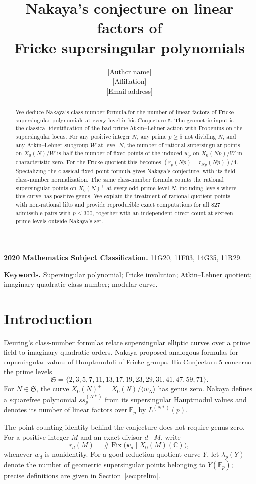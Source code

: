 \documentclass[11pt,a4paper]{article}
\title{Nakaya's conjecture on linear factors of\\Fricke supersingular polynomials}
\author{[Author name]\\\small [Affiliation]\\\small [Email address]}
\date{}
\theoremstyle{remark}\newtheorem{remark}[theorem]{Remark}
\numberwithin{equation}{section}
\newcommand{\C}{\mathbb C}\newcommand{\Fp}{\mathbb F_p}
\newcommand{\Fix}{\operatorname{Fix}}
\begin{document}
\maketitle
\begin{abstract}
We deduce Nakaya's class-number formula for the number of linear factors of Fricke supersingular polynomials at every level in his Conjecture 5. The geometric input is the classical identification of the bad-prime Atkin--Lehner action with Frobenius on the supersingular locus. For any positive integer $N$, any prime $p\geq5$ not dividing $N$, and any Atkin--Lehner subgroup $W$ at level $N$, the number of rational supersingular points on $X_0(N)/W$ is half the number of fixed points of the induced $w_p$ on $X_0(Np)/W$ in characteristic zero. For the Fricke quotient this becomes $(r_p(Np)+r_{Np}(Np))/4$. Specializing the classical fixed-point formula gives Nakaya's conjecture, with its field-class-number normalization. The same class-number formula counts the rational supersingular points on $X_0(N)^+$ at every odd prime level $N$, including levels where this curve has positive genus. We explain the treatment of rational quotient points with non-rational lifts and provide reproducible exact computations for all 827 admissible pairs with $p\leq300$, together with an independent direct count at sixteen prime levels outside Nakaya's set.
\end{abstract}
\noindent\textbf{2020 Mathematics Subject Classification.} 11G20, 11F03, 14G35, 11R29.

\noindent\textbf{Keywords.} Supersingular polynomial; Fricke involution; Atkin--Lehner quotient; imaginary quadratic class number; modular curve.

\section{Introduction}
Deuring's class-number formulas relate supersingular elliptic curves over a prime field to imaginary quadratic orders. Nakaya \cite{Nakaya} proposed analogous formulas for supersingular values of Hauptmoduli of Fricke groups. His Conjecture 5 concerns the prime levels
\[
\mathfrak S=\{2,3,5,7,11,13,17,19,23,29,31,41,47,59,71\}.
\]
For $N\in\mathfrak S$, the curve $X_0(N)^+=X_0(N)/\langle w_N\rangle$ has genus zero. Nakaya defines a squarefree polynomial $ss_p^{(N*)}$ from its supersingular Hauptmodul values and denotes its number of linear factors over $\Fp$ by $L^{(N*)}(p)$.

The point-counting identity behind the conjecture does not require genus zero. For a positive integer $M$ and an exact divisor $d\mid M$, write
\[
r_d(M)=\#\Fix\bigl(w_d\mid X_0(M)(\C)\bigr),
\]
whenever $w_d$ is nonidentity. For a good-reduction quotient curve $Y$, let $\lambda_p(Y)$ denote the number of geometric supersingular points belonging to $Y(\Fp)$; precise definitions are given in Section~\ref{sec:prelim}.
\end{document}
